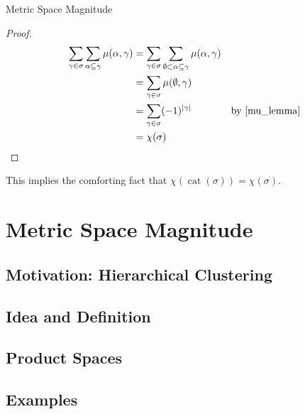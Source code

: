 \documentclass[12pt]{pom_thesis}
\DeclareMathOperator{\cat}{cat}
\begin{document}
\begin{chapter}{Metric Space Magnitude}
\begin{thm}
\end{thm}
\begin{proof}

\begin{align*}
\sum_{\gamma \in \sigma} \sum_{\alpha \subseteq \gamma} \mu(\alpha, \gamma) &= \sum_{\gamma \in \sigma} \sum_{\emptyset \subset \alpha \subseteq \gamma} \mu(\alpha, \gamma)\\
&= \sum_{\gamma \in \sigma} \mu(\emptyset, \gamma)\\
&= \sum_{\gamma \in \sigma} (-1)^{|\gamma|} &\text{by \ref{mu_lemma}}\\
&= \chi(\sigma)
\end{align*}
\end{proof}
This implies the comforting fact that $\chi(\cat(\sigma)) = \chi(\sigma)$.
\section{Metric Space Magnitude}
\subsection{Motivation: Hierarchical Clustering}
\subsection{Idea and Definition}
\subsection{Product Spaces}
\subsection{Examples}
\end{chapter}




\end{document}
